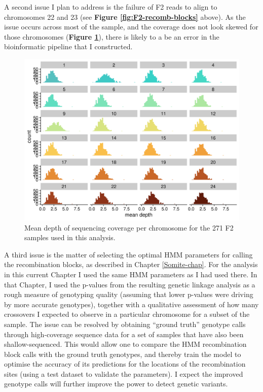 \documentclass[
]{book}
\begin{document}
A second issue I plan to address is the failure of F2 reads to align to chromosomes 22 and 23 (see \textbf{Figure \ref{fig:F2-recomb-blocks}} above). As the issue occurs across most of the sample, and the coverage does not look skewed for those chromosomes (\textbf{Figure \ref{fig:F2-coverage}}), there is likely to a be an error in the bioinformatic pipeline that I constructed.



\begin{figure}
\includegraphics[width=1\linewidth]{figs/mikk_behaviour/coverage_F2} \caption{Mean depth of sequencing coverage per chromosome for the 271 F2 samples used in this analysis.}\label{fig:F2-coverage}
\end{figure}

A third issue is the matter of selecting the optimal HMM parameters for calling the recombination blocks, as described in Chapter \ref{Somite-chap}. For the analysis in this current Chapter I used the same HMM parameters as I had used there. In that Chapter, I used the p-values from the resulting genetic linkage analysis as a rough measure of genotyping quality (assuming that lower p-values were driving by more accurate genotypes), together with a qualitative assessment of how many crossovers I expected to observe in a particular chromosome for a subset of the sample. The issue can be resolved by obtaining ``ground truth'' genotype calls through high-coverage sequence data for a set of samples that have also been shallow-sequenced. This would allow one to compare the HMM recombination block calls with the ground truth genotypes, and thereby train the model to optimise the accuracy of its predictions for the locations of the recombination sites (using a test dataset to validate the parameters). I expect the improved genotype calls will further improve the power to detect genetic variants.
\end{document}
